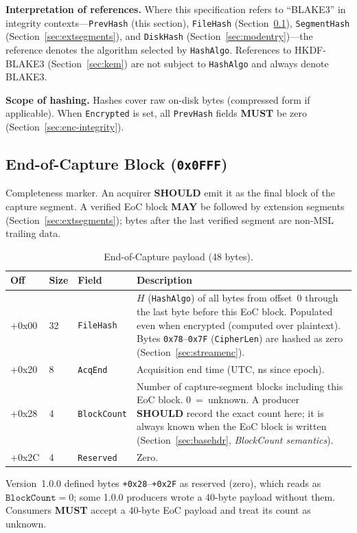 \documentclass[11pt,a4paper]{article}
\newcommand{\MUST}{\textbf{MUST}}
\newcommand{\SHOULD}{\textbf{SHOULD}}
\newcommand{\MAY}{\textbf{MAY}}
\newcommand{\hex}[1]{\texttt{0x#1}}
\newcommand{\field}[1]{\texttt{#1}}
\newcommand{\blake}{BLAKE3}
\begin{document}
\noindent\textbf{Interpretation of references.} Where this specification refers to ``\blake{}'' in integrity contexts---\field{PrevHash} (this section), \field{FileHash} (Section~\ref{sec:eoc}), \field{SegmentHash} (Section~\ref{sec:extsegments}), and \field{DiskHash} (Section~\ref{sec:modentry})---the reference denotes the algorithm selected by \field{HashAlgo}. References to HKDF-\blake{} (Section~\ref{sec:kem}) are not subject to \field{HashAlgo} and always denote BLAKE3.

\noindent\textbf{Scope of hashing.} Hashes cover raw on-disk bytes (compressed form if applicable). When \field{Encrypted} is set, all \field{PrevHash} fields \MUST{} be zero (Section~\ref{sec:enc-integrity}).


\subsection{End-of-Capture Block (\hex{0FFF})}\label{sec:eoc}
Completeness marker. An acquirer \SHOULD{} emit it as the final block of the capture segment. A verified EoC block \MAY{} be followed by extension segments (Section~\ref{sec:extsegments}); bytes after the last verified segment are non-MSL trailing data.
\begin{table}[H]\centering\caption{End-of-Capture payload (48 bytes).}\label{tab:eoc}\small
\begin{tabular}{M M l p{6.5cm}}\toprule\textbf{Off}&\textbf{Size}&\textbf{Field}&\textbf{Description}\\\midrule
+0x00 & 32 & \field{FileHash} & $H$ (\field{HashAlgo}) of all bytes from offset~0 through the last byte before this EoC block. Populated even when encrypted (computed over plaintext). Bytes \hex{78}--\hex{7F} (\field{CipherLen}) are hashed as zero (Section~\ref{sec:streamenc}). \\
+0x20 & 8 & \field{AcqEnd} & Acquisition end time (UTC, ns since epoch). \\
+0x28 & 4 & \field{BlockCount} & Number of capture-segment blocks including this EoC block. 0~=~unknown. A producer \SHOULD{} record the exact count here; it is always known when the EoC block is written (Section~\ref{sec:basehdr}, \emph{BlockCount semantics}). \\
+0x2C & 4 & \field{Reserved} & Zero. \\\bottomrule
\end{tabular}\end{table}

\noindent Version~1.0.0 defined bytes \texttt{+0x28}--\texttt{+0x2F} as reserved (zero), which reads as $\field{BlockCount}=0$; some 1.0.0 producers wrote a 40-byte payload without them. Consumers \MUST{} accept a 40-byte EoC payload and treat its count as unknown.
\end{document}
